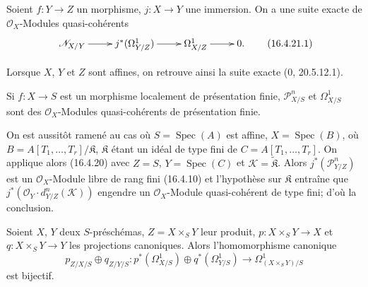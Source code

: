 \begin{corollary}[16.4.21]
\label{IV.16.4.21}
Soient $f:Y\to Z$ un morphisme, $j:X\to Y$ une immersion. On a une suite
exacte de $\mathcal{O}_X$-Modules quasi-cohérents
\[
  \xymatrix{
    \mathscr{N}_{X/Y}\ar[r]&j^*(\Omega_{Y/Z}^1)\ar[r]&
    \Omega_{X/Z}^1\ar[r]&0.
  }
  \tag{16.4.21.1}
  \label{IV.16.4.21.1}
\]
\end{corollary}

Lorsque $X$, $Y$ et $Z$ sont affines, on retrouve ainsi la suite exacte
(0, 20.5.12.1).

\begin{corollary}[16.4.22]
\label{IV.16.4.22}
Si $f:X\to S$ est un morphisme localement de présentation finie,
$\mathscr{P}_{X/S}^n$ et $\Omega_{X/S}^1$ sont des
$\mathcal{O}_X$-Modules quasi-cohérents de présentation finie.
\end{corollary}

On est aussitôt ramené au cas où $S=\operatorname{Spec}(A)$ est affine,
$X=\operatorname{Spec}(B)$, où
$B=A[T_1,\ldots,T_r]/\mathfrak{K}$, $\mathfrak{K}$ étant un idéal de type
fini de $C=A[T_1,\ldots,T_r]$. On applique alors (16.4.20) avec $Z=S$,
$Y=\operatorname{Spec}(C)$ et $\mathscr{K}=\widetilde{\mathfrak{K}}$. Alors
$j^*(\mathscr{P}_{Y/Z}^n)$ est un $\mathcal{O}_X$-Module libre de rang fini
(16.4.10) et l'hypothèse sur $\mathfrak{K}$ entraîne que
$j^*(\mathcal{O}_Y\cdot d_{Y/Z}^n(\mathscr{K}))$ engendre un
$\mathcal{O}_X$-Module quasi-cohérent de type fini; d'où la conclusion.

\begin{proposition}[16.4.23]
\label{IV.16.4.23}
Soient $X$, $Y$ deux $S$-préschémas, $Z=X\times_S Y$ leur produit,
$p:X\times_S Y\to X$ et $q:X\times_S Y\to Y$ les projections canoniques.
Alors l'homomorphisme canonique
\[
  p_{Z/X/S}\oplus q_{Z/Y/S}:
  p^*(\Omega_{X/S}^1)\oplus q^*(\Omega_{Y/S}^1)
  \longrightarrow\Omega_{(X\times_S Y)/S}^1
  \tag{16.4.23.1}
  \label{IV.16.4.23.1}
\]
est bijectif.
\end{proposition}

